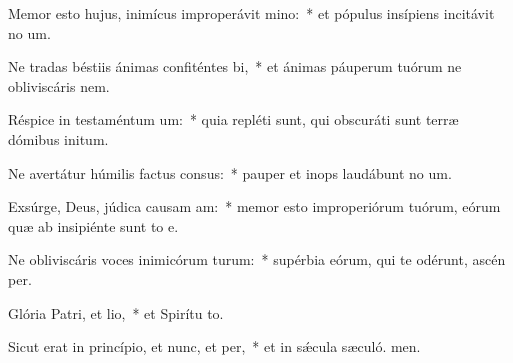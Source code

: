 \item Memor esto hujus, inimícus improperávit mino:~* et pópulus insípiens incitávit no um.
\item Ne tradas béstiis ánimas confiténtes bi,~* et ánimas páuperum tuórum ne obliviscáris  nem.
\item Réspice in testaméntum um:~* quia repléti sunt, qui obscuráti sunt terræ dómibus initum.
\item Ne avertátur húmilis factus consus:~* pauper et inops laudábunt no um.
\item Exsúrge, Deus, júdica causam am:~* memor esto improperiórum tuórum, eórum quæ ab insipiénte sunt to e.
\item Ne obliviscáris voces inimicórum turum:~* supérbia eórum, qui te odérunt, ascén per.
\item Glória Patri, et lio,~* et Spirítu to.
\item Sicut erat in princípio, et nunc, et per,~* et in sǽcula sæculó. men.
